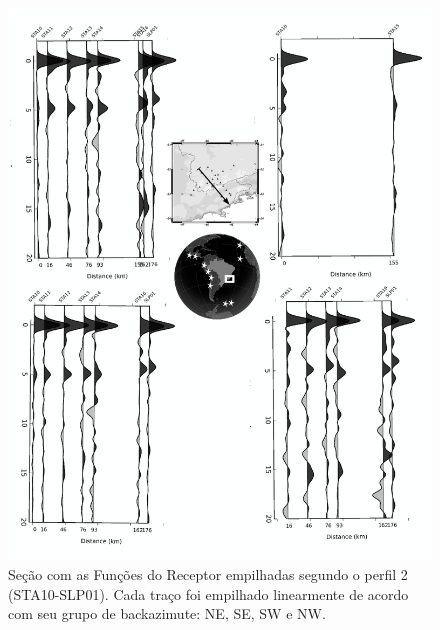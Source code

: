 \begin{figure}[!ht]
\centering
\includegraphics[scale=0.15]{Figs/RF_azimute_perfil2.png}
\caption{Seção com as Funções do Receptor empilhadas segundo o perfil 2 (STA10-SLP01). Cada traço foi empilhado linearmente de acordo com seu grupo de backazimute: NE, SE, SW e NW.}
\label{RF_perfil2}
\end{figure}

